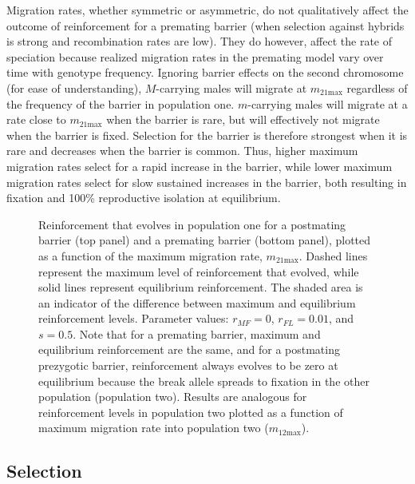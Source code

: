 \documentclass[11pt]{article}
\begin{document}
Migration rates, whether symmetric or asymmetric, do not qualitatively affect the outcome of reinforcement for a premating barrier (when selection against hybrids is strong and recombination rates are low).  They do however, affect the rate of speciation because realized migration rates in the premating model vary over time with genotype frequency. Ignoring barrier effects on the second chromosome (for ease of understanding), $M$-carrying males will migrate at $m_{21\text{max}}$ regardless of the frequency of the barrier in population one. $m$-carrying males will migrate at a rate close to $m_{21\text{max}}$ when the barrier is rare, but will effectively not migrate when the barrier is fixed. Selection for the barrier is therefore strongest when it is rare and decreases when the barrier is common. Thus, higher maximum migration rates select for a rapid increase in the barrier, while lower maximum migration rates select for slow sustained increases in the barrier, both resulting in fixation and 100\% reproductive isolation at equilibrium.  


\begin{figure}
[!htb]
\centering
{}
\caption{
\linespread{1.618}\selectfont
Reinforcement that evolves in population one for a postmating barrier (top panel) and a premating barrier (bottom panel), plotted as a function of the maximum migration rate, $m_{21\text{max}}$. Dashed lines represent the maximum level of reinforcement that evolved, while solid lines represent equilibrium reinforcement.  The shaded area is an indicator of the difference between maximum and equilibrium reinforcement levels. Parameter values: $r_{MF} = 0$, $r_{FL} = 0.01$, and $s = 0.5$. Note that for a premating barrier, maximum and equilibrium reinforcement are the same, and for a postmating prezygotic barrier, reinforcement always evolves to be zero at equilibrium because the break allele spreads to fixation in the other population (population two). Results are analogous for reinforcement levels in population two plotted as a function of maximum migration rate into population two ($m_{12\text{max}}$).
}
\label{fig:migration}
\end{figure}

\FloatBarrier

\subsection*{Selection}\label{section:selection}
\end{document}
